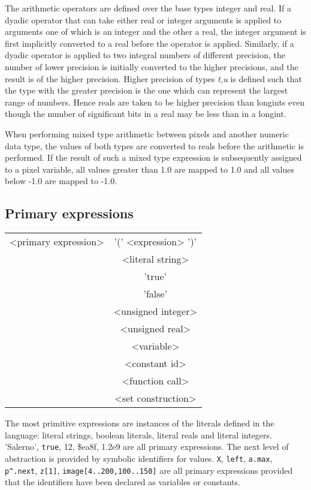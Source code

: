 {The arithmetic operators are defined over the base types integer and real. If
a dyadic operator that can take either real or integer
arguments is applied to arguments one of which is an integer and the other a
real, the integer argument is first implicitly converted to a real before the
operator is applied. Similarly, if a dyadic operator is applied to two integral
numbers of different precision, the number of lower precision is initially converted
to the higher precisions, and the result is of the higher precision. Higher
precision of types \emph{t,u} is defined such that the type with the greater
precision is the one which can represent the largest range of numbers. Hence
reals are taken to be higher precision than longints even though
the number of significant bits in a real may be less than in a longint.

When performing mixed type arithmetic between pixels and another numeric data
type, the values of both types are converted to reals before the arithmetic
is performed. If the result of such a mixed type expression is subsequently
assigned to a pixel variable, all values greater than 1.0 are
mapped to 1.0 and all values below -1.0 are mapped to -1.0. 


\subsection{Primary expressions}

\vspace{0.3cm}
{\centering \begin{tabular}{|c|c|}
\hline 
<primary expression> &
'(' <expression> ')'\\
&
<literal string>\\
&
'true'\\
&
'false'\\
&
<unsigned integer>\\
&
<unsigned real>\\
&
<variable>\\
&
<constant id>\\
&
<function call>\\
&
<set construction>\\
\hline 
\end{tabular}\par}
\vspace{0.3cm}

The most primitive expressions are instances of the literals defined in the
language: literal strings, boolean literals, literal reals and literal integers.
'Salerno', \texttt{true}, 12, \$ea8f, 1.2e9 are all primary expressions. The
next level of abstraction is provided by symbolic identifiers for values. \texttt{X},
\texttt{left}, \texttt{a.max}, \texttt{p\textasciicircum{}.next}, \texttt{z{[}1{]}},
\texttt{image{[}4..200,100..150{]}} are all primary expressions provided that
the identifiers have been declared as variables or constants.

}
